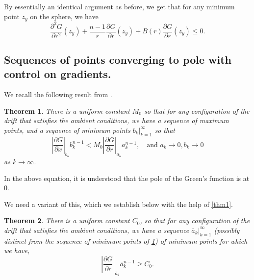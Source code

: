 \documentclass{article}
\newcounter{lem}
\theoremstyle{plain}
\newtheorem{theorem}{Theorem}
\theoremstyle{definition}
\theoremstyle{plain}
\begin{document}
By essentially an identical argument as before, we get that for any minimum point $z_y$ on the sphere, we have
$$\frac{\partial^2 G}{\partial r^2}(z_y) + \frac{n-1}{r} \frac{\partial G}{\partial r}(z_y) + B(r) \frac{\partial G}{\partial r}(z_y) \le 0.$$
\subsection{Sequences of points converging to pole with control on gradients.}
We recall the following result from \cite{Pat25}.

\begin{theorem}\label{lemma4} There is a uniform constant $M_0$ so that for any configuration of the drift that satisfies the ambient conditions, we have a sequence of maximum points, and a sequence of minimum points $b_k|_{k=1}^\infty$ so that
\begin{equation}
\left| \frac{\partial G}{\partial x} \right|_{b_k} b_k^{n-1} < M_0 \left| \frac{\partial G}{\partial r} \right|_{a_k} a_k^{n-1}, \quad \text{and } a_k \to 0, b_k \to 0
\end{equation}
as $k \to \infty$.
\end{theorem}

In the above equation, it is understood that the pole of the Green's function is at 0.

We need a variant of this, which we establish below with the help of \cref{thm1}.

\begin{theorem}\label{lemma5} There is a uniform constant $C_0$, so that for any configuration of the drift that satisfies the ambient conditions, we have a sequence $\bar{a}_k|_{k=1}^\infty$ (possibly distinct from the sequence of minimum points of \cref{lemma4}) of minimum points for which we have,
\begin{equation}
\left| \frac{\partial G}{\partial r} \right|_{\bar{a}_k} \bar{a}_k^{n-1} \ge C_0.
\end{equation}
\end{theorem}
\end{document}
